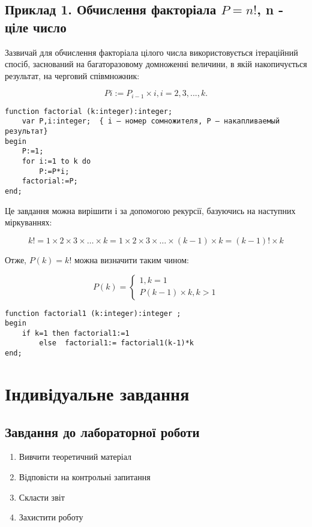 \subsection*{Приклад 1. Обчислення факторіала $P=n!$, n - ціле число}

Зазвичай для обчислення факторіала цілого числа використовується ітераційний спосіб, заснований на багаторазовому домноженні величини, в якій накопичується результат, на черговий співмножник: 

\begin{equation}
Pi := P_{i-1} \times i, i=2,3,...,k.  
\end{equation}

\begin{lstlisting}[label=iter1,caption=Ітераційна функція] 
function factorial (k:integer):integer;
	var P,i:integer;  { i – номер сомножителя, P – накапливаемый результат}
begin
	P:=1;
	for i:=1 to k do
		P:=P*i;
	factorial:=P;
end;
\end{lstlisting}

Це завдання можна вирішити і за допомогою рекурсії, базуючись на наступних міркуваннях:

\begin{equation}
k! = 1 \times 2 \times 3 \times \dots \times k =  1 \times 2 \times 3 \times \dots \times (k-1) \times k = (k-1)! \times k
\end{equation}

Отже, $P(k) = k!$ можна визначити таким чином:

\begin{equation}
P(k) = 
 \begin{cases}
   1,k=1\\
   P(k-1)\times k,k>1
 \end{cases}
\end{equation}

\begin{lstlisting}[label=iter1,caption=Рекурентна функція] 
function factorial1 (k:integer):integer ;
begin
	if k=1 then factorial1:=1 
		else  factorial1:= factorial1(k-1)*k
end;
\end{lstlisting}




\section{Індивідуальне завдання}
\nopagebreak[4]
\subsection*{Завдання до лабораторної роботи}
\nopagebreak[4]
\begin{enumerate}
\item Вивчити теоретичний матеріал
\item Відповісти на контрольні запитання
\item Скласти звіт
\item Захистити роботу
\end{enumerate}

